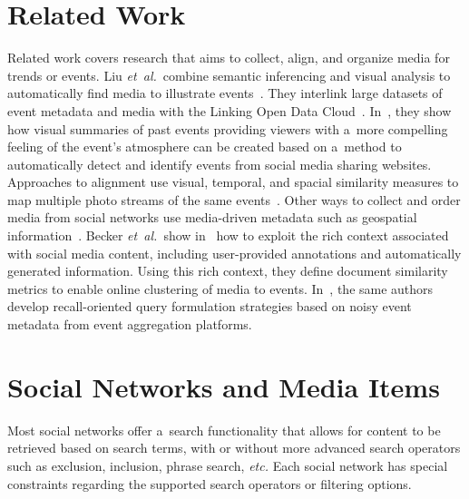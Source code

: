 \section{Related Work}

Related work covers research
that aims to collect, align, and organize media
for trends or events.
Liu \emph{et~al.}\ combine semantic inferencing and visual analysis
to automatically find media to illustrate
events~\cite{liu2011events}.
They interlink large datasets of event metadata
and media with the Linking Open Data
Cloud~\cite{bizer2011statelodcloud,cyganiak2011lodcloud}.
In~\cite{liu2011socialmedia}, they show how visual summaries
of past events providing viewers with a~more compelling feeling
of the event's atmosphere can be created
based on a~method to automatically detect and identify events
from social media sharing websites.
Approaches to alignment use visual, temporal,
and spacial similarity measures to map multiple photo streams of
the same events~\cite{yang2011photostream}.
Other ways to collect and order media from social networks use
media-driven metadata such as geospatial
information~\cite{crandall2009mappingphotos}.
Becker \emph{et~al.}\ show in~\cite{becker2010eventidentification}
how to exploit the rich context associated with social media
content, including user-provided annotations
and automatically generated information.
Using this rich context, they define document similarity metrics
to enable online clustering of media to events.
In~\cite{becker2012plannedevents}, the same authors develop 
recall-oriented query formulation strategies
based on noisy event metadata
from event aggregation platforms.

\section{Social Networks and Media Items}                                    \label{sec:social-networks}

Most social networks offer a~search functionality that allows for
content to be retrieved based on search terms,
with or without more advanced search operators
such as exclusion, inclusion, phrase search, \emph{etc.}
Each social network has special constraints
regarding the supported search operators or filtering options.

